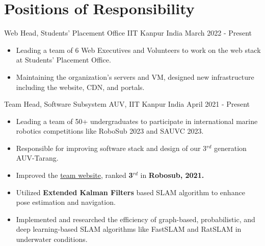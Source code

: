 \section*{\sc Positions of Responsibility}
\vspace{-2mm}
\hrulefill
\vspace{1mm}

\cventry
{Web Head, Students' Placement Office} %
{IIT Kanpur} %
{India} %
{March 2022 - Present} %
{
  \begin{itemize} %
    \item Leading a team of 6 Web Executives and Volunteers to work on the web stack at Students' Placement Office.
    \item Maintaining the organization’s servers and VM, designed new infrastructure including the website, CDN, and portals.
  \end{itemize}
}

\cventry
{Team Head, Software Subsystem} %
{AUV, IIT Kanpur} %
{India} %
{April 2021 - Present} %
{
  \begin{itemize} %
    \item Leading a team of 50+ undergraduates to participate in international marine robotics competitions like RoboSub 2023 and SAUVC 2023.
    \item Responsible for improving software stack and design of our 3$^{rd}$ generation AUV-Tarang.
    \item {Improved the \href{https://auv.sntiitk.in/}{team website}, ranked \textbf{3$^{rd}$} in \textbf{Robosub, 2021.}}
    \item Utilized \textbf{Extended Kalman Filters} based SLAM algorithm to enhance pose estimation and navigation.
    \item Implemented and researched the efficiency of graph-based, probabilistic, and deep learning-based SLAM algorithms like FastSLAM and RatSLAM in underwater conditions.
  \end{itemize}
}

